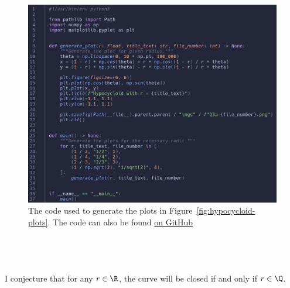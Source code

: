 \documentclass[a4paper]{article}
\begin{document}
\begin{figure}[h]
	\centering
	\includegraphics[scale=0.3]{Q3a-code}
	\caption{The code used to generate the plots in Figure~\ref{fig:hypocycloid-plots}. The code can also be found \href{https://github.com/DoctorDalek1963/uni}{on GitHub}}
\end{figure}

\subsection{~}

I conjecture that for any $r \in \R$, the curve will be closed if and only if $r \in \Q$.
\end{document}
